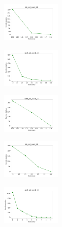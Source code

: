\newpage

\begin{figure}[H]
    \centering
    \begin{subfigure}
        \centering
        \includegraphics[width=0.32\textwidth]{img/copkm2/iris_set_const_10_949004259_cost.png}
    \end{subfigure}
    \hfill
    \begin{subfigure}
        \centering
        \includegraphics[width=0.32\textwidth]{img/copkm2/ecoli_set_const_10_949004259_cost.png}
    \end{subfigure}
    \hfill
    \begin{subfigure}
        \centering
        \includegraphics[width=0.32\textwidth]{img/copkm2/rand_set_const_10_949004259_cost.png}
    \end{subfigure}
    \hfill
    \begin{subfigure}
        \centering
        \includegraphics[width=0.32\textwidth]{img/copkm2/iris_set_const_10_589741062_cost.png}
    \end{subfigure}
    \hfill
    \begin{subfigure}
        \centering
        \includegraphics[width=0.32\textwidth]{img/copkm2/ecoli_set_const_10_589741062_cost.png}

\end{subfigure}
\end{figure}
